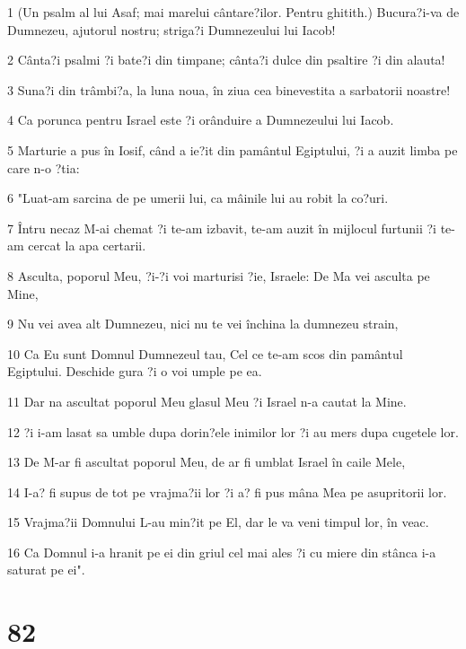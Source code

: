 \par 1 (Un psalm al lui Asaf; mai marelui cântare?ilor. Pentru ghitith.) Bucura?i-va de Dumnezeu, ajutorul nostru; striga?i Dumnezeului lui Iacob!
\par 2 Cânta?i psalmi ?i bate?i din timpane; cânta?i dulce din psaltire ?i din alauta!
\par 3 Suna?i din trâmbi?a, la luna noua, în ziua cea binevestita a sarbatorii noastre!
\par 4 Ca porunca pentru Israel este ?i orânduire a Dumnezeului lui Iacob.
\par 5 Marturie a pus în Iosif, când a ie?it din pamântul Egiptului, ?i a auzit limba pe care n-o ?tia:
\par 6 "Luat-am sarcina de pe umerii lui, ca mâinile lui au robit la co?uri.
\par 7 Întru necaz M-ai chemat ?i te-am izbavit, te-am auzit în mijlocul furtunii ?i te-am cercat la apa certarii.
\par 8 Asculta, poporul Meu, ?i-?i voi marturisi ?ie, Israele: De Ma vei asculta pe Mine,
\par 9 Nu vei avea alt Dumnezeu, nici nu te vei închina la dumnezeu strain,
\par 10 Ca Eu sunt Domnul Dumnezeul tau, Cel ce te-am scos din pamântul Egiptului. Deschide gura ?i o voi umple pe ea.
\par 11 Dar na ascultat poporul Meu glasul Meu ?i Israel n-a cautat la Mine.
\par 12 ?i i-am lasat sa umble dupa dorin?ele inimilor lor ?i au mers dupa cugetele lor.
\par 13 De M-ar fi ascultat poporul Meu, de ar fi umblat Israel în caile Mele,
\par 14 I-a? fi supus de tot pe vrajma?ii lor ?i a? fi pus mâna Mea pe asupritorii lor.
\par 15 Vrajma?ii Domnului L-au min?it pe El, dar le va veni timpul lor, în veac.
\par 16 Ca Domnul i-a hranit pe ei din griul cel mai ales ?i cu miere din stânca i-a saturat pe ei".

\chapter{82}

